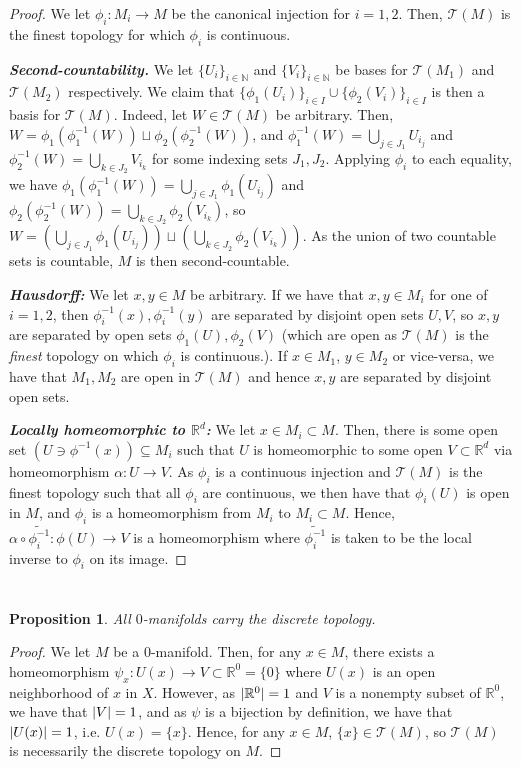\documentclass[english]{article}
\DeclarePairedDelimiter\abs{\lvert}{\rvert}%
\newcommand{\RR}{\mathbb{R}}
\newcommand{\NN}{\mathbb{N}}
\newcommand{\prob}[1]{\setcounter{section}{#1-1}\section{}}
\newcommand{\prt}[1]{\setcounter{subsection}{#1-1}\subsection{}}
\newtheorem*{proposition*}{Proposition}
\theoremstyle{remark}
\theoremstyle{definition}
\newcommand{\Tt}{\mathcal{T}}
\begin{document}
\begin{proof}
	We let $\phi_i:M_i\to M$ be the canonical injection for $i=1,2$. Then, $\Tt(M)$ is the finest topology for which $\phi_i$ is continuous.
	
	\textbf{\emph{Second-countability.}} We let $\{U_i\}_{i\in \NN}$ and $\{V_i\}_{i\in \NN}$ be bases for $\Tt(M_1)$ and $\Tt(M_2)$ respectively. We claim that $\{\phi_1(U_i)\}_{i\in I}\cup\{\phi_2(V_i)\}_{i\in I}$ is then a basis for $\Tt(M)$. Indeed, let $W\in \Tt(M)$ be arbitrary. Then, $W=\phi_1(\phi_1^{-1}(W))\sqcup\phi_2(\phi_2^{-1}(W)) $, and $\phi_1^{-1}(W)=\bigcup_{j\in J_1} U_{i_j}$ and $\phi_2^{-1}(W)=\bigcup_{k\in J_2} V_{i_k}$ for some indexing sets $J_1,J_2$. Applying $\phi_i$ to each equality, we have $\phi_1(\phi_1^{-1}(W))=\bigcup_{j\in J_1} \phi_1(U_{i_j})$ and $\phi_2(\phi_2^{-1}(W))=\bigcup_{k\in J_2} \phi_2(V_{i_k})$, so $W=\left(\bigcup_{j\in J_1} \phi_1(U_{i_j})\right)\sqcup\left(\bigcup_{k\in J_2} \phi_2(V_{i_k})\right)$. As the union of two countable sets is countable, $M$ is then second-countable.
	
	\textbf{\emph{Hausdorff:}} We let $x,y\in M$ be arbitrary. If we have that $x,y\in M_i$ for one of $i=1,2$, then $\phi^{-1}_i(x),\phi_i^{-1}(y)$ are separated by disjoint open sets $U,V$, so $x,y$ are separated by open sets $\phi_1(U),\phi_2(V)$ (which are open as $\Tt(M)$ is the \emph{finest} topology on which $\phi_i$ is continuous.). If $x\in M_1$, $y\in M_2$ or vice-versa, we have that $M_1,M_2$ are open in $\Tt(M)$ and hence $x,y$ are separated by disjoint open sets.
	
	\textbf{\emph{Locally homeomorphic to $\RR^d$:}} We let $x\in M_i\subset M$. Then, there is some open set $(U\ni \phi^{-1}(x))\subseteq M_i$ such that $U$ is homeomorphic to some open $V\subset \RR^d$ via homeomorphism $\alpha:U\to V$. As $\phi_i$ is a continuous injection and $\Tt(M)$ is the finest topology such that all $\phi_i$ are continuous, we then have that $\phi_i(U)$ is open in $M$, and $\phi_i$ is a homeomorphism from $M_i$ to $M_i\subset M$. Hence, $\alpha\circ \tilde{\phi_i^{-1}}:\phi(U)\to V$ is a homeomorphism where $\tilde{\phi_i^{-1}}$ is taken to be the local inverse to $\phi_i$ on its image.
\end{proof}
\prob{4}
\prt{1}
\begin{proposition*}
	All $0$-manifolds carry the discrete topology.
\end{proposition*}
\begin{proof}
	We let $M$ be a $0$-manifold. Then, for any $x\in M$, there exists a homeomorphism $\psi_x:U(x)\to V\subset \RR^0=\{0\}$ where $U(x)$ is an open neighborhood of $x$ in $X$. However, as $\abs{\RR^0}=1$ and $V$ is a nonempty subset of $\RR^0$, we have that $\abs{V}=1$, and as $\psi$ is a bijection by definition, we have that $\abs{U(x)}=1$, i.e. $U(x)=\{x\}$. Hence, for any $x\in M$, $\{x\}\in \Tt(M)$, so $\Tt(M)$ is necessarily the discrete topology on $M$.
\end{proof}
\end{document}
